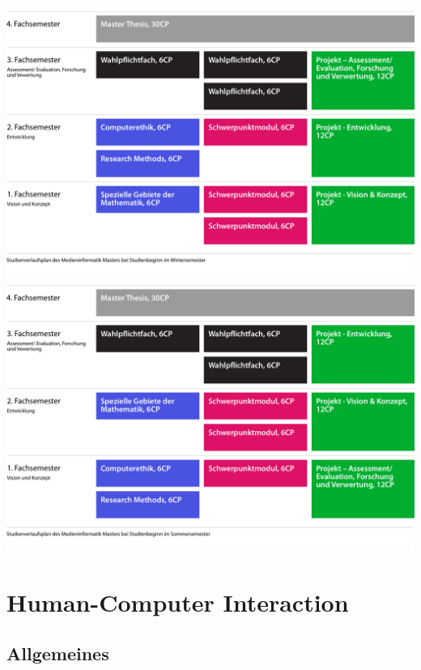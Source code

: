 \includegraphics[width=\columnwidth]{../anhaenge/bilder/ws-small.png}
\includegraphics[width=\columnwidth]{../anhaenge/bilder/ss-small.png}

\chapter{Human-Computer
Interaction\label{/mi-2017/modulbeschreibungen-master/schwerpunkt-human-computer-interaction}}\label{human-computer-interactionpathlabelmi-2017modulbeschreibungen-masterschwerpunkt-human-computer-interaction}

\section*{Allgemeines\label{/mi-2017/modulbeschreibungen-master/schwerpunkt-human-computer-interaction}}\label{allgemeinespathlabelmi-2017modulbeschreibungen-masterschwerpunkt-human-computer-interaction}

